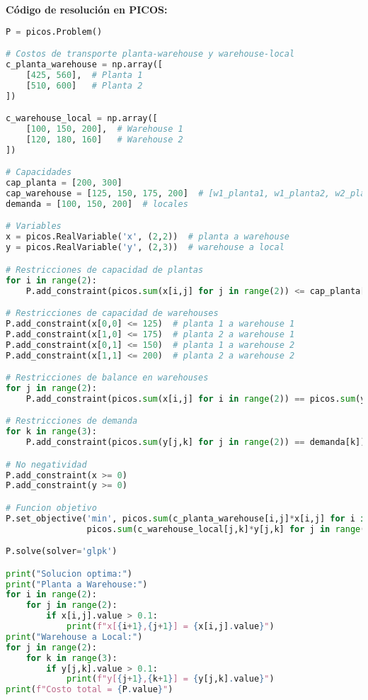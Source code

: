 \documentclass[12pt]{article}
\begin{document}
\textbf{Código de resolución en PICOS:}
\begin{lstlisting}[language=Python]
P = picos.Problem()

# Costos de transporte planta-warehouse y warehouse-local
c_planta_warehouse = np.array([
    [425, 560],  # Planta 1
    [510, 600]   # Planta 2
])

c_warehouse_local = np.array([
    [100, 150, 200],  # Warehouse 1
    [120, 180, 160]   # Warehouse 2
])

# Capacidades
cap_planta = [200, 300]
cap_warehouse = [125, 150, 175, 200]  # [w1_planta1, w1_planta2, w2_planta1, w2_planta2]
demanda = [100, 150, 200]  # locales

# Variables
x = picos.RealVariable('x', (2,2))  # planta a warehouse
y = picos.RealVariable('y', (2,3))  # warehouse a local

# Restricciones de capacidad de plantas
for i in range(2):
    P.add_constraint(picos.sum(x[i,j] for j in range(2)) <= cap_planta[i])

# Restricciones de capacidad de warehouses
P.add_constraint(x[0,0] <= 125)  # planta 1 a warehouse 1
P.add_constraint(x[1,0] <= 175)  # planta 2 a warehouse 1
P.add_constraint(x[0,1] <= 150)  # planta 1 a warehouse 2
P.add_constraint(x[1,1] <= 200)  # planta 2 a warehouse 2

# Restricciones de balance en warehouses
for j in range(2):
    P.add_constraint(picos.sum(x[i,j] for i in range(2)) == picos.sum(y[j,k] for k in range(3)))

# Restricciones de demanda
for k in range(3):
    P.add_constraint(picos.sum(y[j,k] for j in range(2)) == demanda[k])

# No negatividad
P.add_constraint(x >= 0)
P.add_constraint(y >= 0)

# Funcion objetivo
P.set_objective('min', picos.sum(c_planta_warehouse[i,j]*x[i,j] for i in range(2) for j in range(2)) +
                picos.sum(c_warehouse_local[j,k]*y[j,k] for j in range(2) for k in range(3)))

P.solve(solver='glpk')

print("Solucion optima:")
print("Planta a Warehouse:")
for i in range(2):
    for j in range(2):
        if x[i,j].value > 0.1:
            print(f"x[{i+1},{j+1}] = {x[i,j].value}")
print("Warehouse a Local:")
for j in range(2):
    for k in range(3):
        if y[j,k].value > 0.1:
            print(f"y[{j+1},{k+1}] = {y[j,k].value}")
print(f"Costo total = {P.value}")
\end{lstlisting}
\end{document}

